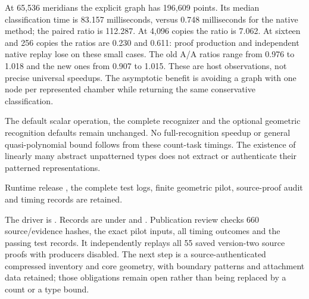 At 65,536 meridians the explicit graph has 196,609 points. Its median
classification time is 83.157 milliseconds, versus 0.748 milliseconds for
the native method; the paired ratio is 112.287. At 4,096 copies the ratio
is 7.062. At sixteen and 256 copies the ratios are 0.230 and 0.611:
proof production and independent native replay lose on these small cases.
The old A/A ratios range from 0.976 to 1.018 and the new ones from 0.907
to 1.015. These are host observations, not precise universal speedups.
The asymptotic benefit is avoiding a graph with one node per represented
chamber while returning the same conservative classification.

The default scalar operation, the complete recognizer and the optional
geometric recognition defaults remain unchanged. No full-recognition speedup
or general quasi-polynomial bound follows from these count-task timings.
The existence of linearly many abstract unpatterned types does not extract
or authenticate their patterned representations.

Runtime release , the complete test logs, finite geometric
pilot, source-proof audit and timing records are retained.

The driver is . Records are
under  and .
Publication review checks 660 source/evidence hashes, the exact pilot inputs,
all timing outcomes and the passing test records. It independently replays
all 55 saved version-two source proofs with producers disabled.
The next step is a source-authenticated compressed inventory and core geometry,
with boundary patterns and attachment data retained; those obligations remain
open rather than being replaced by a count or a type bound.
